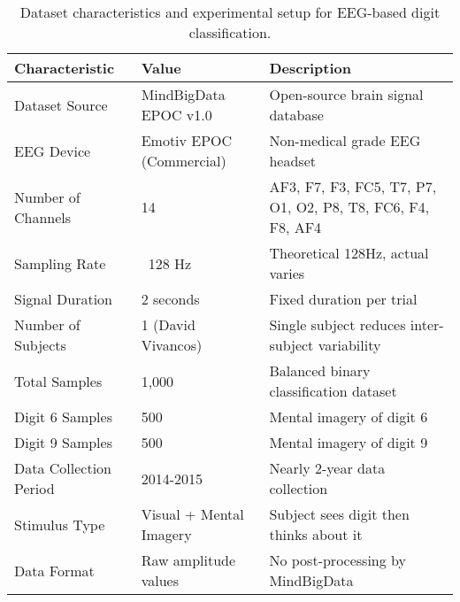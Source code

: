 \begin{table}
\caption{Dataset characteristics and experimental setup for EEG-based digit classification.}
\label{tab:dataset_characteristics}
\begin{tabular}{l|l|p{6cm}}
\toprule
Characteristic & Value & Description \\
\midrule
Dataset Source & MindBigData EPOC v1.0 & Open-source brain signal database \\
EEG Device & Emotiv EPOC (Commercial) & Non-medical grade EEG headset \\
Number of Channels & 14 & AF3, F7, F3, FC5, T7, P7, O1, O2, P8, T8, FC6, F4, F8, AF4 \\
Sampling Rate & ~128 Hz & Theoretical 128Hz, actual varies \\
Signal Duration & 2 seconds & Fixed duration per trial \\
Number of Subjects & 1 (David Vivancos) & Single subject reduces inter-subject variability \\
Total Samples & 1,000 & Balanced binary classification dataset \\
Digit 6 Samples & 500 & Mental imagery of digit 6 \\
Digit 9 Samples & 500 & Mental imagery of digit 9 \\
Data Collection Period & 2014-2015 & Nearly 2-year data collection \\
Stimulus Type & Visual + Mental Imagery & Subject sees digit then thinks about it \\
Data Format & Raw amplitude values & No post-processing by MindBigData \\
\bottomrule
\end{tabular}
\end{table}
